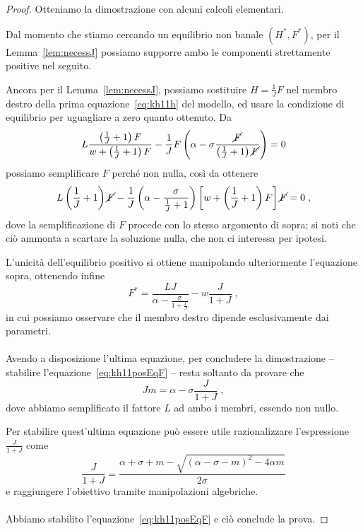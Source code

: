 \begin{proof}
    Otteniamo la dimostrazione con alcuni calcoli elementari.

    Dal momento che stiamo cercando un equilibrio non banale $(H^*, F^*)$, per il
    Lemma~\ref{lem:necessJ} possiamo supporre ambo le componenti strettamente positive nel seguito.

    Ancora per il Lemma~\ref{lem:necessJ}, possiamo sostituire $H=\frac{1}{J} F$ nel membro destro della
    prima equazione~\eqref{eq:kh11h} del modello, ed usare la condizione di equilibrio per uguagliare
    a zero quanto ottenuto. Da
    $$L \frac{ \left( \frac{1}{J} +1 \right) F }{ w +\left( \frac{1}{J} +1 \right) F }
    - \frac{1}{J} F \left( \alpha - \sigma \frac{\cancel{F}}{ \left( \frac{1}{J} +1 \right) \cancel{F} } \right) = 0$$
    possiamo semplificare $F$ perché non nulla, così da ottenere
    $$L \left( \frac{1}{J} +1 \right) \cancel{F} - \frac{1}{J} \left( \alpha - \frac{\sigma}{ \frac{1}{J} +1 } \right)
    \left[ w + \left( \frac{1}{J} +1 \right) F \right] \cancel{F} = 0 \; ,$$
    dove la semplificazione di $F$ procede con lo stesso argomento di sopra; si noti che ciò ammonta a scartare la
    soluzione nulla, che non ci interessa per ipotesi.

    L'unicità dell'equilibrio positivo si ottiene manipolando ulteriormente l'equazione sopra, ottenendo infine
    $$F^* = \frac{LJ}{ \alpha - \frac{\sigma}{ 1 + \frac{1}{J} } } - w \frac{J}{1+J} \; ,$$
    in cui possiamo osservare che il membro destro dipende esclusivamente dai parametri.

    \paragraph{}
    Avendo a disposizione l'ultima equazione, per concludere la dimostrazione -- \ie stabilire
    l'equazione~\eqref{eq:kh11posEqF} -- resta soltanto da provare che
    $$J m = \alpha - \sigma \frac{J}{1+J} \; ,$$
    dove abbiamo semplificato il fattore $L$ ad ambo i membri, essendo non nullo.

    Per stabilire quest'ultima equazione può essere utile razionalizzare l'espressione $\frac{J}{1+J}$ come
    $$\frac{J}{1+J} = \frac{ \alpha + \sigma + m - \sqrt{ {(\alpha - \sigma -m)}^2 - 4 \alpha m } }{2 \sigma}$$
    e raggiungere l'obiettivo tramite manipolazioni algebriche.

    \paragraph{}
    Abbiamo stabilito l'equazione~\eqref{eq:kh11posEqF} e ciò conclude la prova.
\end{proof}

